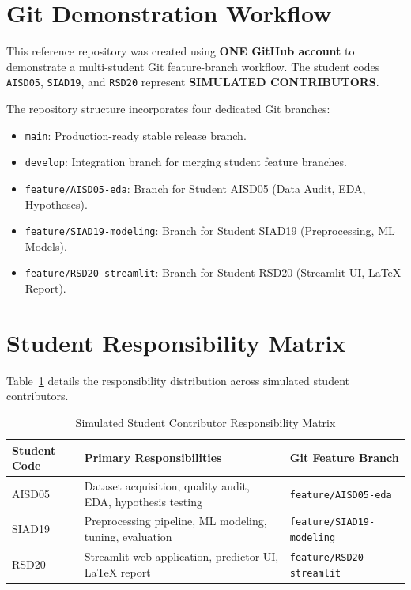 \section{Git Demonstration Workflow}
\begin{tcolorbox}[colback=yellow!15!white,colframe=orange!80!black,title=\textbf{DEMONSTRATION GIT WORKFLOW NOTICE}]
This reference repository was created using \textbf{ONE GitHub account} to demonstrate a multi-student Git feature-branch workflow. The student codes \texttt{AISD05}, \texttt{SIAD19}, and \texttt{RSD20} represent \textbf{SIMULATED CONTRIBUTORS}.
\end{tcolorbox}

The repository structure incorporates four dedicated Git branches:
\begin{itemize}
    \item \texttt{main}: Production-ready stable release branch.
    \item \texttt{develop}: Integration branch for merging student feature branches.
    \item \texttt{feature/AISD05-eda}: Branch for Student AISD05 (Data Audit, EDA, Hypotheses).
    \item \texttt{feature/SIAD19-modeling}: Branch for Student SIAD19 (Preprocessing, ML Models).
    \item \texttt{feature/RSD20-streamlit}: Branch for Student RSD20 (Streamlit UI, LaTeX Report).
\end{itemize}

\section{Student Responsibility Matrix}
Table~\ref{tab:contrib_matrix} details the responsibility distribution across simulated student contributors.

\begin{table}[H]
\centering
\caption{Simulated Student Contributor Responsibility Matrix}
\label{tab:contrib_matrix}
\small
\begin{tabular}{lll}
\toprule
\textbf{Student Code} & \textbf{Primary Responsibilities} & \textbf{Git Feature Branch} \\
\midrule
AISD05 & Dataset acquisition, quality audit, EDA, hypothesis testing & \texttt{feature/AISD05-eda} \\
SIAD19 & Preprocessing pipeline, ML modeling, tuning, evaluation & \texttt{feature/SIAD19-modeling} \\
RSD20 & Streamlit web application, predictor UI, LaTeX report & \texttt{feature/RSD20-streamlit} \\
\bottomrule
\end{tabular}
\end{table}
